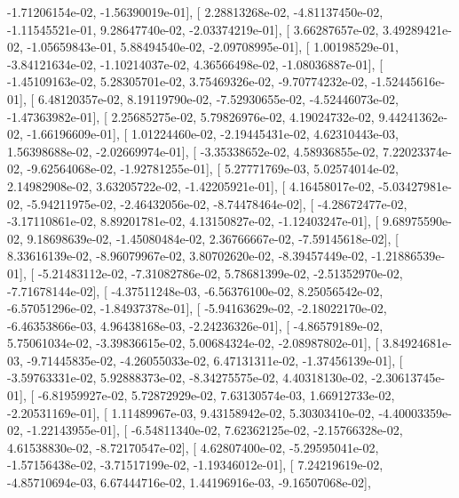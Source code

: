 \documentclass{article}
\begin{document}
         -1.71206154e-02,  -1.56390019e-01],
       [  2.28813268e-02,  -4.81137450e-02,  -1.11545521e-01,
          9.28647740e-02,  -2.03374219e-01],
       [  3.66287657e-02,   3.49289421e-02,  -1.05659843e-01,
          5.88494540e-02,  -2.09708995e-01],
       [  1.00198529e-01,  -3.84121634e-02,  -1.10214037e-02,
          4.36566498e-02,  -1.08036887e-01],
       [ -1.45109163e-02,   5.28305701e-02,   3.75469326e-02,
         -9.70774232e-02,  -1.52445616e-01],
       [  6.48120357e-02,   8.19119790e-02,  -7.52930655e-02,
         -4.52446073e-02,  -1.47363982e-01],
       [  2.25685275e-02,   5.79826976e-02,   4.19024732e-02,
          9.44241362e-02,  -1.66196609e-01],
       [  1.01224460e-02,  -2.19445431e-02,   4.62310443e-03,
          1.56398688e-02,  -2.02669974e-01],
       [ -3.35338652e-02,   4.58936855e-02,   7.22023374e-02,
         -9.62564068e-02,  -1.92781255e-01],
       [  5.27771769e-03,   5.02574014e-02,   2.14982908e-02,
          3.63205722e-02,  -1.42205921e-01],
       [  4.16458017e-02,  -5.03427981e-02,  -5.94211975e-02,
         -2.46432056e-02,  -8.74478464e-02],
       [ -4.28672477e-02,  -3.17110861e-02,   8.89201781e-02,
          4.13150827e-02,  -1.12403247e-01],
       [  9.68975590e-02,   9.18698639e-02,  -1.45080484e-02,
          2.36766667e-02,  -7.59145618e-02],
       [  8.33616139e-02,  -8.96079967e-02,   3.80702620e-02,
         -8.39457449e-02,  -1.21886539e-01],
       [ -5.21483112e-02,  -7.31082786e-02,   5.78681399e-02,
         -2.51352970e-02,  -7.71678144e-02],
       [ -4.37511248e-03,  -6.56376100e-02,   8.25056542e-02,
         -6.57051296e-02,  -1.84937378e-01],
       [ -5.94163629e-02,  -2.18022170e-02,  -6.46353866e-03,
          4.96438168e-03,  -2.24236326e-01],
       [ -4.86579189e-02,   5.75061034e-02,  -3.39836615e-02,
          5.00684324e-02,  -2.08987802e-01],
       [  3.84924681e-03,  -9.71445835e-02,  -4.26055033e-02,
          6.47131311e-02,  -1.37456139e-01],
       [ -3.59763331e-02,   5.92888373e-02,  -8.34275575e-02,
          4.40318130e-02,  -2.30613745e-01],
       [ -6.81959927e-02,   5.72872929e-02,   7.63130574e-03,
          1.66912733e-02,  -2.20531169e-01],
       [  1.11489967e-03,   9.43158942e-02,   5.30303410e-02,
         -4.40003359e-02,  -1.22143955e-01],
       [ -6.54811340e-02,   7.62362125e-02,  -2.15766328e-02,
          4.61538830e-02,  -8.72170547e-02],
       [  4.62807400e-02,  -5.29595041e-02,  -1.57156438e-02,
         -3.71517199e-02,  -1.19346012e-01],
       [  7.24219619e-02,  -4.85710694e-03,   6.67444716e-02,
          1.44196916e-03,  -9.16507068e-02],
\end{document}
